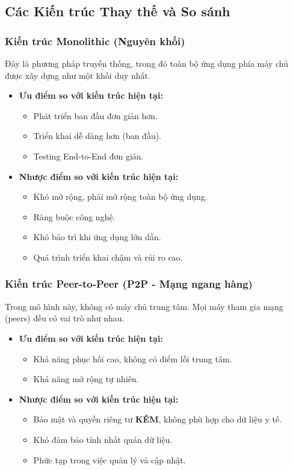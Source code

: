 \subsection{Các Kiến trúc Thay thế và So sánh}

\subsubsection{Kiến trúc Monolithic (Nguyên khối)}
Đây là phương pháp truyền thống, trong đó toàn bộ ứng dụng phía máy chủ được xây dựng như một khối duy nhất.
\begin{itemize}
    \item \textbf{Ưu điểm so với kiến trúc hiện tại:}
    \begin{itemize}
        \item Phát triển ban đầu đơn giản hơn.
        \item Triển khai dễ dàng hơn (ban đầu).
        \item Testing End-to-End đơn giản.
    \end{itemize}
    \item \textbf{Nhược điểm so với kiến trúc hiện tại:}
    \begin{itemize}
        \item Khó mở rộng, phải mở rộng toàn bộ ứng dụng.
        \item Ràng buộc công nghệ.
        \item Khó bảo trì khi ứng dụng lớn dần.
        \item Quá trình triển khai chậm và rủi ro cao.
    \end{itemize}
\end{itemize}

\subsubsection{Kiến trúc Peer-to-Peer (P2P - Mạng ngang hàng)}
Trong mô hình này, không có máy chủ trung tâm. Mọi máy tham gia mạng (peers) đều có vai trò như nhau.
\begin{itemize}
    \item \textbf{Ưu điểm so với kiến trúc hiện tại:}
    \begin{itemize}
        \item Khả năng phục hồi cao, không có điểm lỗi trung tâm.
        \item Khả năng mở rộng tự nhiên.
    \end{itemize}
    \item \textbf{Nhược điểm so với kiến trúc hiện tại:}
    \begin{itemize}
        \item Bảo mật và quyền riêng tư \textbf{KÉM}, không phù hợp cho dữ liệu y tế.
        \item Khó đảm bảo tính nhất quán dữ liệu.
        \item Phức tạp trong việc quản lý và cập nhật.
    \end{itemize}
\end{itemize}

